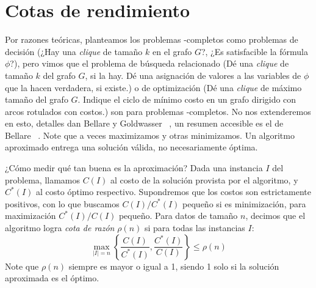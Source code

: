 \section{Cotas de rendimiento}
\label{sec:cotas-de-rendimiento}

  Por razones teóricas,
  planteamos los problemas \NP\nobreakdash-completos
  como problemas de decisión
  (¿Hay una \emph{\foreignlanguage{english}{clique}} de tamaño \(k\)
   en el grafo \(G\)?,
   ¿Es satisfacible la fórmula \(\phi\)?),
  pero vimos que el problema de búsqueda relacionado
  (Dé una \emph{\foreignlanguage{english}{clique}} de tamaño \(k\)
   del grafo \(G\),
   si la hay.
   Dé una asignación de valores a las variables de \(\phi\)
   que la hacen verdadera,
   si existe.)
  o de optimización
  (Dé una \emph{\foreignlanguage{english}{clique}} de máximo tamaño
   del grafo \(G\).
   Indique el ciclo de mínimo costo en un grafo dirigido
   con arcos rotulados con costos.)
  son  para problemas \NP\nobreakdash-completos.
  No nos extenderemos en esto,
  detalles dan Bellare y Goldwasser~%
    \cite{bellare94:_complexity_decision_search},
  un resumen accesible es el de Bellare~%
    \cite{bellare10:_decision_search}.
  Note que a veces maximizamos y otras minimizamos.
  Un algoritmo aproximado entrega una solución válida,
  no necesariamente óptima.

  ¿Cómo medir qué tan buena es la aproximación?
  Dada una instancia \(I\) del problema,
  llamamos \(C(I)\) al costo de la solución provista por el algoritmo,
  y \(C^*(I)\) al costo óptimo respectivo.
  Supondremos que los costos son estrictamente positivos,
  con lo que buscamos \(C(I) / C^*(I)\) pequeño si es minimización,
  para maximización \(C^*(I) / C(I)\) pequeño.
  Para datos de tamaño \(n\),
  decimos que el algoritmo logra \emph{cota de razón} \(\rho(n)\)
  si para todas las instancias \(I\):
  \begin{equation*}
    \max_{\lvert I \rvert = n}
      \left\{
        \frac{C(I)}{C^*(I)},
        \frac{C^*(I)}{C(I)}
      \right\}
      \le \rho(n)
  \end{equation*}
  Note que \(\rho(n)\) siempre es mayor o igual a \num{1},
  siendo \num{1} solo si la solución aproximada es el óptimo.

